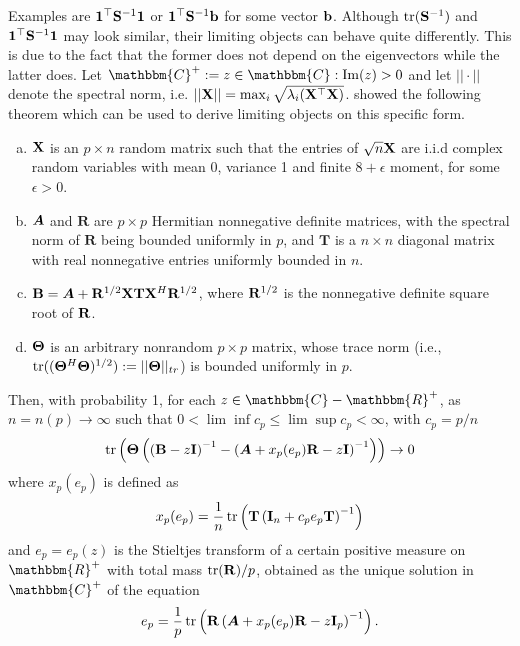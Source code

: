 \documentclass[12pt, oneside]{book}\usepackage{knitr}
\begin{document}
Examples are $\mathbf{1}^\top \mathbf{S}^{-1} \mathbf{1}$ or $\mathbf{1}^\top \mathbf{S}^{-1} \mathbf{b}$ for some vector $\mathbf{b}$. 
Although $\operatorname{tr}(\mathbf{S}^{-1})$ and $\mathbf{1}^\top \mathbf{S}^{-1} \mathbf{1}$ may look similar, their limiting objects can behave quite differently. 
This is due to the fact that the former does not depend on the eigenvectors while the latter does.
Let $\mathbbm{C}^+ := {z \in \mathbbm{C}: \operatorname{Im}(z)>0}$ and let $||\cdot||$ denote the spectral norm, i.e. $|| \mathbf{X} || =\max_i \sqrt{\lambda_{i}(\mathbf{X}^\top \mathbf{X})}$.
\citet{rubio2011spectral} showed the following theorem which can be used to derive limiting objects on this specific form.
\begin{theorem}\label{thm:rubio}\hfill\break
\begin{enumerate}[(a)]
  \item \label{enum:1} $\mathbf{X}$ is an $p \times n$ random matrix such that the entries of $\sqrt{n}\mathbf{X}$ are i.i.d complex random variables with mean 0, variance 1 and finite $8+\epsilon$ moment, for some $\epsilon > 0$.
  \item \label{enum:2} $\mbox{\boldmath$A$}$ and $\mathbf{R}$ are $p \times p$ Hermitian nonnegative definite matrices, with the spectral norm of $\mathbf{R}$ being bounded uniformly in $p$, and $\mathbf{T}$ is a $n \times n$ diagonal matrix with real nonnegative entries uniformly bounded in $n$.
  \item \label{enum:3} $\mathbf{B}=\mbox{\boldmath$A$} + \mathbf{R}^{1/2} \mathbf{X} \mathbf{T} \mathbf{X}^H \mathbf{R}^{1/2}$, where $\mathbf{R}^{1/2}$ is the nonnegative definite square root of $\mathbf{R}$.
  \item \label{enum:4} $\mathbf{\Theta}$ is an arbitrary nonrandom $p \times p$ matrix, whose trace norm (i.e., $\operatorname{tr}((\mathbf{\Theta}^H \mathbf{\Theta})^{1/2}):=||\mathbf{\Theta}||_{tr}$) is bounded uniformly in $p$.
\end{enumerate}

Then, with probability 1, for each $z\in \mathbbm{C}-\mathbbm{R}^+$, as $n=n(p) \rightarrow \infty$ such that $0<\lim\inf c_p \leq \lim \sup c_p < \infty$, with $c_p = p/n$
\begin{equation}
  \operatorname{tr}\left(\mathbf{\Theta}\left( \left(\mathbf{B} - z\mathbf{I}\right)^{-1} - \left( \mbox{\boldmath$A$} + x_p(e_p)\mathbf{R} - z\mathbf{I} \right)^{-1} \right) \right) \rightarrow 0
\end{equation}
where $x_p(e_p)$ is defined as
\begin{equation}
  x_p(e_p) = \frac{1}{n}\operatorname{tr} \left( \mathbf{T} \left(\mathbf{I}_n + c_p e_p \mathbf{T} \right)^{-1} \right)
\end{equation}
and $e_p=e_p(z)$ is the Stieltjes transform of a certain positive measure on $\mathbbm{R}^+$ with total mass $\operatorname{tr}(\mathbf{R})/p$, obtained as the unique solution in $\mathbbm{C}^+$ of the equation
\begin{equation}
  e_p = \frac{1}{p}\operatorname{tr} \left( \mathbf{R} \left(\mbox{\boldmath$A$} +  x_p(e_p) \mathbf{R} - z\mathbf{I}_p \right)^{-1} \right).
\end{equation}
\end{theorem}
\end{document}

